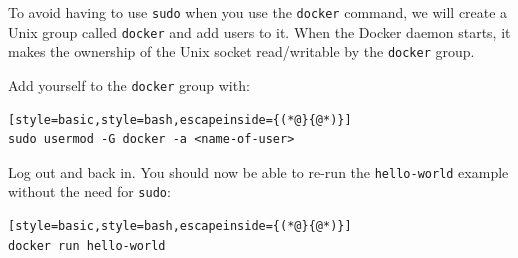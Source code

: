 \documentclass[12pt, a4paper, twoside, openany, titlepage]{book}
\begin{document}
To avoid having to use \texttt{sudo} when you use the \texttt{docker} command, we will create a Unix group called \texttt{docker} and add users to it. When the Docker daemon starts, it makes the ownership of the Unix socket read/writable by the \texttt{docker} group.

Add yourself to the \texttt{docker} group with:
\begin{lstlisting}[style=basic,style=bash,escapeinside={(*@}{@*)}]
sudo usermod -G docker -a <name-of-user>
\end{lstlisting}
Log out and back in. You should now be able to re-run the \texttt{hello-world} example without the need for \texttt{sudo}:
\begin{lstlisting}[style=basic,style=bash,escapeinside={(*@}{@*)}]
docker run hello-world
\end{lstlisting}







\end{document}
